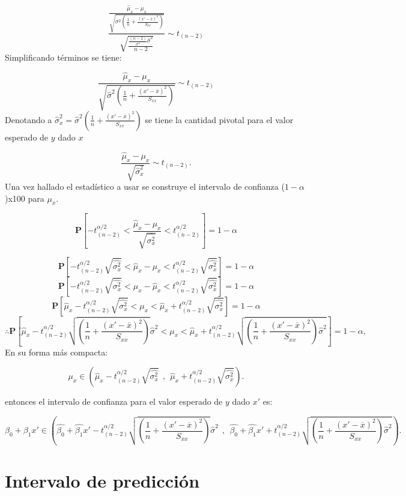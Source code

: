 \documentclass[a4paper,oneside,openany]{book}
\begin{document}
\[\frac{\frac{\hat{\mu}_{x}-\mu_{x}}{\sqrt{\sigma^2\left( \frac{1}{n}+\frac{(x'-\overline{x})^2}{S_{xx}}\right)}}}{\sqrt{\frac{\frac{(n-2)}{\sigma^2}\hat{\sigma}^2}{n-2}}}\sim t_{(n-2)}\]
Simplificando términos se tiene:

\[\frac{\hat{\mu}_{x}-\mu_{x}}{\sqrt{\hat{\sigma}^2\left( \frac{1}{n}+\frac{(x'-\overline{x})^2}{S_{xx}}\right)}}\sim t_{(n-2)}\]
Denotando a
\(\hat{\sigma}_{x}^2=\hat{\sigma}^2\left(\frac{1}{n}+\frac{(x'-\overline{x})^2}{S_{xx}}\right)\)
se tiene la cantidad pivotal para el valor esperado de \(y\) dado \(x\)

\[\frac{\hat{\mu}_{x}-\mu_{x}}{\sqrt{\hat{\sigma}_{x}^2}}\sim t_{(n-2)}.\]
Una vez hallado el estadístico a usar se construye el intervalo de
confianza (\(1-\alpha\))x100 para \(\mu_{x}\).

\[\mathbf{P}\left[-t_{(n-2)}^{\alpha/2} < \frac{\hat{\mu}_{x}-\mu_{x}}{\sqrt{\hat{\sigma_{x}^2}}} < t_{(n-2)}^{\alpha/2}\right]=1-\alpha\]

\[\mathbf{P}\left[-t_{(n-2)}^{\alpha/2}\sqrt{\hat{\sigma_{x}^2}}<\hat{\mu}_{x}-\mu_{x}<t_{(n-2)}^{\alpha/2}\sqrt{\hat{\sigma_{x}^2}}\right]=1-\alpha\]
\[\mathbf{P}\left[-t_{(n-2)}^{\alpha/2}\sqrt{\hat{\sigma_{x}^2}}<\mu_{x}-\hat{\mu}_{x}<t_{(n-2)}^{\alpha/2}\sqrt{\hat{\sigma_{x}^2}}\right]=1-\alpha\]
\[\mathbf{P}\left[\hat{\mu}_{x}-t_{(n-2)}^{\alpha/2}\sqrt{\hat{\sigma_{x}^2}}<\mu_{x}<\hat{\mu}_{x}+t_{(n-2)}^{\alpha/2}\sqrt{\hat{\sigma_{x}^2}}\right]=1-\alpha\]
\[\therefore \mathbf{P}\left[\hat{\mu}_{x}-t_{(n-2)}^{\alpha/2}\sqrt{\left( \frac{1}{n}+\frac{(x'-\overline{x})^2}{S_{xx}}\right)}\hat{\sigma}^2<\mu_{x}<\hat{\mu}_{x}+t_{(n-2)}^{\alpha/2}\sqrt{\left( \frac{1}{n}+\frac{(x'-\overline{x})^2}{S_{xx}}\right)\hat{\sigma}^2}\right]=1-\alpha,\]
En su forma más compacta:

\[\mu_{x} \in \left(\hat{\mu}_{x}-t_{(n-2)}^{\alpha/2}\sqrt{\hat{\sigma_{x}^2}} \ \ , \ \ \hat{\mu}_{x}+t_{(n-2)}^{\alpha/2}\sqrt{\hat{\sigma_{x}^2}}\right).\]

entonces el intervalo de confianza para el valor esperado de \(y\) dado
\(x'\) es:

\[\beta_{0}+\beta_{1}x' \in \left(\hat{\beta_{0}}+\hat{\beta_{1}}x'-t_{(n-2)}^{\alpha/2}\sqrt{\left( \frac{1}{n}+\frac{(x'-\overline{x})^2}{S_{xx}}\right)}\hat{\sigma}^2 \ \ , \ \ \hat{\beta_{0}}+\hat{\beta_{1}}x'+t_{(n-2)}^{\alpha/2}\sqrt{\left( \frac{1}{n}+\frac{(x'-\overline{x})^2}{S_{xx}}\right)\hat{\sigma}^2}\right).\]

\section{Intervalo de predicción}\label{intervalo-de-predicciuxf3n}
\end{document}
